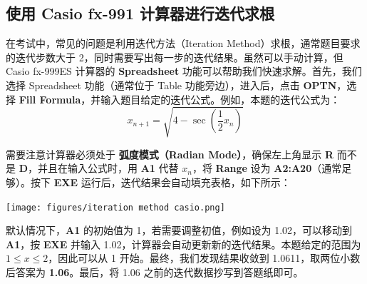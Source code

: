 \documentclass[8pt,a4paper,twoside]{tau-class/tau}
\begin{document}
\subsection{使用 Casio fx-991 计算器进行迭代求根}
在考试中，常见的问题是利用迭代方法（Iteration Method）求根，通常题目要求的迭代步数大于 2，同时需要写出每一步的迭代结果。虽然可以手动计算，但 Casio fx-999ES 计算器的 \textbf{Spreadsheet} 功能可以帮助我们快速求解。首先，我们选择 Spreadsheet 功能（通常位于 Table 功能旁边），进入后，点击 \textbf{OPTN}，选择 \textbf{Fill Formula}，并输入题目给定的迭代公式。例如，本题的迭代公式为：
\[
x_{n+1} = \sqrt{4 − \sec\left(\frac{1}{2}x_n\right)}
\]
\begin{center}
    \captionsetup{labelformat=empty} 
\end{center}
需要注意计算器必须处于 \textbf{弧度模式（Radian Mode）}，确保左上角显示 \textbf{R} 而不是 \textbf{D}，并且在输入公式时，用 \textbf{A1} 代替 $x_n$，将 \textbf{Range} 设为 \textbf{A2:A20}（通常足够）。按下 \textbf{EXE} 运行后，迭代结果会自动填充表格，如下所示：
\begin{center}
    \texttt{[image: figures/iteration method casio.png]}
\end{center}
默认情况下，\textbf{A1} 的初始值为 1，若需要调整初值，例如设为 1.02，可以移动到 \textbf{A1}，按 \textbf{EXE} 并输入 1.02，计算器会自动更新新的迭代结果。本题给定的范围为 $1 \leq x \leq 2$，因此可以从 1 开始。最终，我们发现结果收敛到 1.0611，取两位小数后答案为 \textbf{1.06}。最后，将 1.06 之前的迭代数据抄写到答题纸即可。
\newpage
\end{document}
